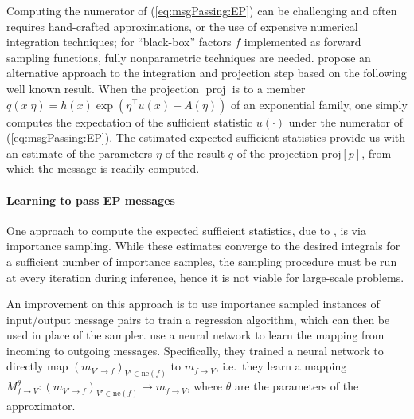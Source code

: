 \documentclass[english]{article}
\theoremstyle{plain}
\theoremstyle{plain}
\newcommand{\factor}{f}				%
\newcommand{\outV}{V}                         %
\newcommand{\fis}[1]{\mathrm{ne}(#1)}   	%
\newcommand{\msg}[2]{m_{#1 \rightarrow #2}}			%
\newcommand{\approxMsg}[3]{M_{#1 \rightarrow #2}^{#3}}			%
\newcommand{\projP}[1]{\mathrm{proj} \left [ #1 \right]}
\DeclareMathOperator*{\proj}{\text{proj}} %
\newcommand{\dsnote}[1]{}%
\begin{document}

Computing the numerator of (\ref{eq:msgPassing:EP}) can be challenging and
often requires hand-crafted approximations, or
the use of expensive numerical integration techniques; for ``black-box''
factors $\factor$ implemented as forward sampling functions, fully
nonparametric techniques are needed. 
\citet{Barthelme2011,Heess2013,Eslami2014} propose an alternative
approach to the integration and projection step based on the following well known result.  
When the projection $\proj$
is to a member $q(x|\eta)=h(x)\exp\left(\eta^{\top}u(x)-A(\eta)\right)$ of an
exponential family, one simply computes the expectation of the sufficient
statistic $u(\cdot)$ under the numerator of (\ref{eq:msgPassing:EP}).
The estimated expected sufficient statistics provide us with an estimate
of the parameters $\eta$ of the result $q$ of the projection $\projP{p}$, from
which the message is readily computed.\dsnote{isn't $\eta$ the actual message?}



\paragraph{Learning to pass EP messages}

One approach to compute the expected sufficient statistics, due to \citet{Barthelme2011}, is 
via importance sampling.  While these estimates converge to the desired
integrals for a sufficient number of importance samples, the sampling procedure
must be run at every iteration during inference, hence  it is not viable for
large-scale problems.

An improvement on this approach is to use importance sampled instances of input/output
message pairs to train a regression algorithm, which can then be used in place of the sampler.
\citet{Heess2013} use a neural network to learn the mapping from incoming
to outgoing messages. Specifically, they trained 
a neural network to directly map $(\msg{\outV'}{\factor} )_{\outV'
    \in \fis{\factor}}$ to 
    $\msg{\factor}{\outV}$, i.e.\ they learn a mapping
$\approxMsg{\factor}{\outV}{\theta}: (\msg{\outV'}{\factor} )_{\outV' \in
    \fis{\factor}} \mapsto \msg{\factor}{\outV}$,
where $\theta$ are the parameters of the approximator.
\end{document}
